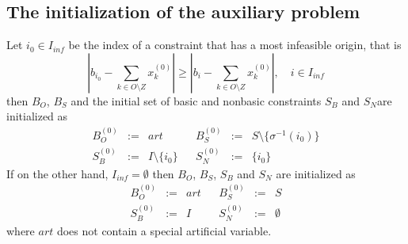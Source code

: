 \documentclass[a4paper]{article}
\begin{document}
\subsection{The initialization of the auxiliary problem}
Let $i_{0} \in I_{inf}$ be the index of a constraint that has a most infeasible
origin, that is 
\begin{equation}
  \left| b_{i_{0}}-\sum_{k \in O \setminus Z}x_{k}^{(0)} \right|
  \geq 
  \left|b_{i}-\sum_{k \in O \setminus Z}x_{k}^{(0)}\right|, \quad i \in I_{inf}
\end{equation}
then $B_{O}$, $B_{S}$ and the initial set of basic and nonbasic constraints
$S_{B}$ and $S_{N}$are initialized as
\begin{equation}
\begin{array}{ccccccc}
  \label{def:headings_init_io}
B_{O}^{(0)} &:=& art && B_{S}^{(0)} &:=& S \setminus
  \{\sigma^{-1}\left(i_{0}\right)\} \\
S_{B}^{(0)} &:=& I \setminus \{i_{0}\} && S_{N}^{(0)} & := & \{ i_{0} \} 
\end{array}
\end{equation}
If on the other hand, $I_{inf}=\emptyset$ then $B_{O}$, $B_{S}$, $S_{B}$ and
$S_{N}$ are initialized as
\begin{equation}
\begin{array}{ccccccc}
\label{def:headings_init_fo}
B_{O}^{(0)} &:=& art && B_{S}^{(0)} &:=& S \\
S_{B}^{(0)} &:=&I && S_{N}^{(0)}&:=& \emptyset
\end{array}
\end{equation}
where $art$ does not contain a special artificial variable.
\end{document}
